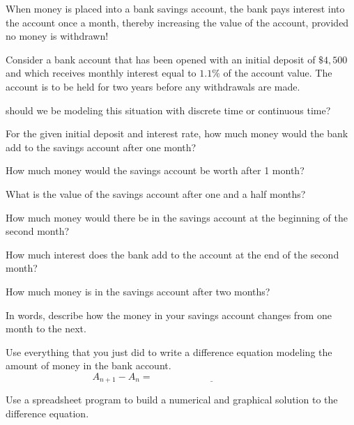 \begin{problem}\label{prob:bank_difference_eqn}
When money is placed into a bank savings account, the bank pays interest into the account
once a month, thereby increasing the value of the account, provided no money is withdrawn!

Consider a bank account that has been opened with an initial deposit of $\$4,500$
and which receives monthly interest equal to $1.1\%$ of the account value.
The account is to be held for two years before any withdrawals are made.
\ba
\item should we be modeling this situation with discrete time or continuous time?
\item For the given initial deposit and interest rate, how much money would the bank add
    to the savings account after one month?
\item How much money would the savings account be worth after 1 month?
\item What is the value of the savings account after one and a half months?
\item How much money would there be in the savings account at the beginning of the second
    month?
\item How much interest does the bank add to the account at the end of the second month?
\item How much money is in the savings account after two months?
\item In words, describe how the money in your savings account changes from one month to
    the next.
\item Use everything that you just did to write a difference equation modeling the amount
    of money in the bank account.
    \[ A_{n+1} - A_n = \underline{\hspace{2in}} \]
\item Use a spreadsheet program to build a numerical and graphical solution to the
    difference equation.
\ea
\end{problem}

